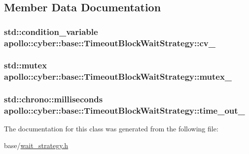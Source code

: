 \subsection{Member Data Documentation}
\hypertarget{classapollo_1_1cyber_1_1base_1_1TimeoutBlockWaitStrategy_a8ca443c25600262b45e9edbb16b1d317}{
\subsubsection[{cv\-\_\-}]{\setlength{\rightskip}{0pt plus 5cm}std\-::condition\-\_\-variable apollo\-::cyber\-::base\-::\-Timeout\-Block\-Wait\-Strategy\-::cv\-\_\-\hspace{0.3cm}{\ttfamily [private]}}}\label{classapollo_1_1cyber_1_1base_1_1TimeoutBlockWaitStrategy_a8ca443c25600262b45e9edbb16b1d317}
\hypertarget{classapollo_1_1cyber_1_1base_1_1TimeoutBlockWaitStrategy_a80b1e0c8b1eafa79aaf84b6bb1ff444e}{
\subsubsection[{mutex\-\_\-}]{\setlength{\rightskip}{0pt plus 5cm}std\-::mutex apollo\-::cyber\-::base\-::\-Timeout\-Block\-Wait\-Strategy\-::mutex\-\_\-\hspace{0.3cm}{\ttfamily [private]}}}\label{classapollo_1_1cyber_1_1base_1_1TimeoutBlockWaitStrategy_a80b1e0c8b1eafa79aaf84b6bb1ff444e}
\hypertarget{classapollo_1_1cyber_1_1base_1_1TimeoutBlockWaitStrategy_a9dc28b4322af9a5dda67979eb1af0404}{
\subsubsection[{time\-\_\-out\-\_\-}]{\setlength{\rightskip}{0pt plus 5cm}std\-::chrono\-::milliseconds apollo\-::cyber\-::base\-::\-Timeout\-Block\-Wait\-Strategy\-::time\-\_\-out\-\_\-\hspace{0.3cm}{\ttfamily [private]}}}\label{classapollo_1_1cyber_1_1base_1_1TimeoutBlockWaitStrategy_a9dc28b4322af9a5dda67979eb1af0404}


The documentation for this class was generated from the following file\-:\begin{DoxyCompactItemize}
\item 
base/\hyperlink{wait__strategy_8h}{wait\-\_\-strategy.\-h}\end{DoxyCompactItemize}
